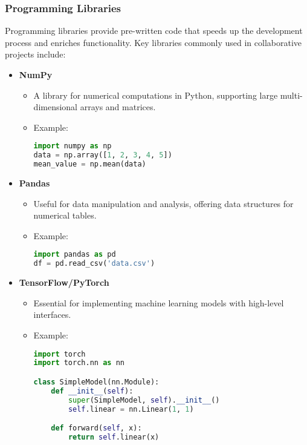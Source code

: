 \documentclass[aspectratio=169]{beamer}
\begin{document}
\begin{frame}[fragile]
    \frametitle{Programming Libraries}
    Programming libraries provide pre-written code that speeds up the development process and enriches functionality. Key libraries commonly used in collaborative projects include:
    \begin{itemize}
        \item \textbf{NumPy}
        \begin{itemize}
            \item A library for numerical computations in Python, supporting large multi-dimensional arrays and matrices.
            \item Example:
            \begin{lstlisting}[language=Python]
import numpy as np
data = np.array([1, 2, 3, 4, 5])
mean_value = np.mean(data)
            \end{lstlisting}
        \end{itemize}

        \item \textbf{Pandas}
        \begin{itemize}
            \item Useful for data manipulation and analysis, offering data structures for numerical tables.
            \item Example:
            \begin{lstlisting}[language=Python]
import pandas as pd
df = pd.read_csv('data.csv')
            \end{lstlisting}
        \end{itemize}

        \item \textbf{TensorFlow/PyTorch}
        \begin{itemize}
            \item Essential for implementing machine learning models with high-level interfaces.
            \item Example:
            \begin{lstlisting}[language=Python]
import torch
import torch.nn as nn

class SimpleModel(nn.Module):
    def __init__(self):
        super(SimpleModel, self).__init__()
        self.linear = nn.Linear(1, 1)

    def forward(self, x):
        return self.linear(x)
            \end{lstlisting}
        \end{itemize}
    \end{itemize}
\end{frame}
\end{document}
